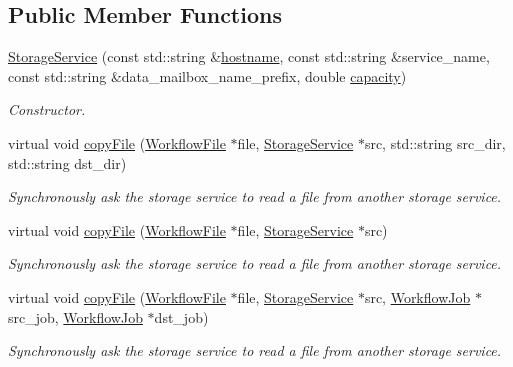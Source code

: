 \subsection*{Public Member Functions}
\begin{DoxyCompactItemize}
\item 
\hyperlink{classwrench_1_1_storage_service_a51e58bfcc4e6ff289e1ca00b8243a7af}{Storage\+Service} (const std\+::string \&\hyperlink{classwrench_1_1_s4_u___daemon_a52bc0b9a6cd248310749dac086819f00}{hostname}, const std\+::string \&service\+\_\+name, const std\+::string \&data\+\_\+mailbox\+\_\+name\+\_\+prefix, double \hyperlink{classwrench_1_1_storage_service_aa6697c2288acc1e053268de586ee1861}{capacity})
\begin{DoxyCompactList}\small\item\em Constructor. \end{DoxyCompactList}\item 
virtual void \hyperlink{classwrench_1_1_storage_service_ae26c18fa6afe1df093b4302cb5fc33dd}{copy\+File} (\hyperlink{classwrench_1_1_workflow_file}{Workflow\+File} $\ast$file, \hyperlink{classwrench_1_1_storage_service}{Storage\+Service} $\ast$src, std\+::string src\+\_\+dir, std\+::string dst\+\_\+dir)
\begin{DoxyCompactList}\small\item\em Synchronously ask the storage service to read a file from another storage service. \end{DoxyCompactList}\item 
virtual void \hyperlink{classwrench_1_1_storage_service_acc7859ce8455467718cfb5433cf41c89}{copy\+File} (\hyperlink{classwrench_1_1_workflow_file}{Workflow\+File} $\ast$file, \hyperlink{classwrench_1_1_storage_service}{Storage\+Service} $\ast$src)
\begin{DoxyCompactList}\small\item\em Synchronously ask the storage service to read a file from another storage service. \end{DoxyCompactList}\item 
virtual void \hyperlink{classwrench_1_1_storage_service_a074c6ae7e32c7c47c4da1cc14cebe654}{copy\+File} (\hyperlink{classwrench_1_1_workflow_file}{Workflow\+File} $\ast$file, \hyperlink{classwrench_1_1_storage_service}{Storage\+Service} $\ast$src, \hyperlink{classwrench_1_1_workflow_job}{Workflow\+Job} $\ast$src\+\_\+job, \hyperlink{classwrench_1_1_workflow_job}{Workflow\+Job} $\ast$dst\+\_\+job)
\begin{DoxyCompactList}\small\item\em Synchronously ask the storage service to read a file from another storage service. \end{DoxyCompactList}\item 

\end{DoxyCompactItemize}
